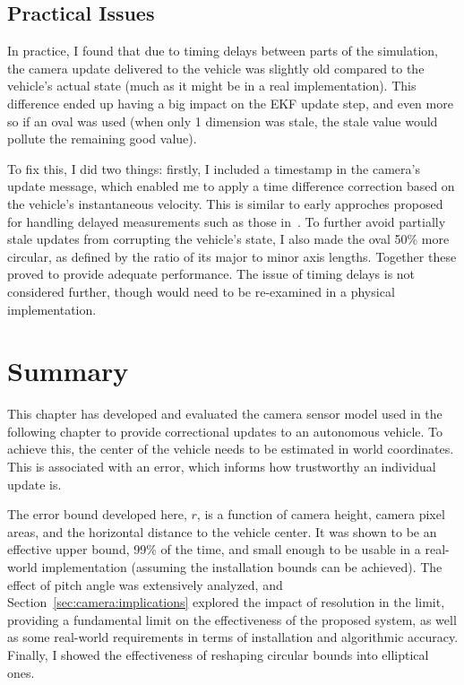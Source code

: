 \documentclass[a4paper,12pt,twoside,openright]{report}
\begin{document}
\subsection{Practical Issues}
In practice, I found that due to timing delays between parts of the simulation,
the camera update delivered to the vehicle was slightly old compared to the
vehicle's actual state (much as it might be in a real implementation). This
difference ended up having a big impact on the EKF update step, and even
more so if an oval was used (when only 1 dimension was stale, the stale
value would pollute the remaining good value).

To fix this, I did two things: firstly, I included a timestamp in the 
camera's update message, which enabled me to apply a time difference
correction based on the vehicle's instantaneous velocity. This is 
similar to early approches proposed for handling delayed measurements
such as those in~\cite{larsen1998incorporation}\cite{tessier2006real}.
To further avoid partially stale updates from corrupting the vehicle's state,
I also made the oval 50\% more circular, as defined by the ratio
of its major to minor axis lengths. Together these proved to 
provide adequate performance. The issue of timing delays is not considered 
further, though would need to be re-examined in a physical implementation.
 
\section{Summary}

This chapter has developed and evaluated the camera sensor model
used in the following chapter to provide correctional updates
to an autonomous vehicle. To achieve this, the center
of the vehicle needs to be estimated in world coordinates. This
is associated with an error, which informs how trustworthy
an individual update is.

The error bound developed here, $r$, is a function of camera height,
camera pixel areas, and the horizontal distance to the vehicle center.
It was shown to be an effective upper bound, 99\% of the time, and
small enough to be usable in a real-world implementation (assuming
the installation bounds can be achieved). The effect of pitch angle
was extensively analyzed, and Section~\ref{sec:camera:implications}
explored the impact of resolution in the limit, providing a 
fundamental limit on the effectiveness of the proposed system,
as well as some real-world requirements in terms of
installation and algorithmic accuracy. Finally, I showed
the effectiveness of reshaping circular bounds into elliptical ones.
\end{document}
